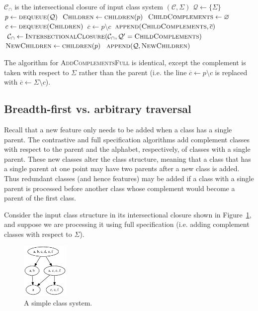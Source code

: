 \documentclass[11pt, oneside]{article}   	%
\begin{document}
\vspace{\baselineskip} \noindent \begin{algorithmic}
	\REQUIRE $\mathcal C_\cap$ is the intersectional closure of input class system $(\mathcal C, \Sigma)$
	\STATE
	\STATE $\mathcal Q \leftarrow \{\Sigma\}$
	\STATE
	\STATE $p \leftarrow \textsc{dequeue}(\mathcal Q)$
	\STATE $\textsc{Children} \leftarrow \textsc{children}(p)$
	\STATE $\textsc{ChildComplements} \leftarrow \varnothing$
	\STATE $c \leftarrow \textsc{dequeue}(\textsc{Children})$
	\STATE $\overline{c} \leftarrow p \setminus c$
	\STATE $\textsc{append}(\textsc{ChildComplements},\overline{c})$
	\ENDIF
	\ENDWHILE
	\STATE $\mathcal C_\cap \leftarrow \textsc{IntersectionalClosure}(\mathcal C_\cap, \mathcal Q' = \textsc{ChildComplements})$
	\STATE $\textsc{NewChildren} \leftarrow \textsc{children}(p)$
	\STATE $\textsc{append}(\mathcal Q, \textsc{NewChildren})$
	\ENDWHILE
\end{algorithmic}

The algorithm for \textsc{AddComplementsFull} is identical, except the complement is taken with respect to $\Sigma$ rather than the parent (i.e. the line $\overline{c} \leftarrow p \setminus c$ is replaced with $\overline{c} \leftarrow \Sigma \setminus c$).

\subsection{Breadth-first vs. arbitrary traversal}
\label{app:bfs}

Recall that a new feature only needs to be added when a class has a single parent. The contrastive and full specification algorithms add complement classes with respect to the parent and the alphabet, respectively, of classes with a single parent. These new classes alter the class structure, meaning that a class that has a single parent at one point may have two parents after a new class is added. Thus redundant classes (and hence features) may be added if a class with a single parent is processed before another class whose complement would become a parent of the first class.

Consider the input class structure in its intersectional closure shown in Figure~\ref{fig:bfs1}, and suppose we are processing it using full specification (i.e. adding complement classes with respect to $\Sigma$). 

\begin{figure}[htb!]
	\centering
	\includegraphics[width=0.2\textwidth]{bfs1.png}
	\caption{A simple class system.}
	\label{fig:bfs1}
\end{figure}
\end{document}
